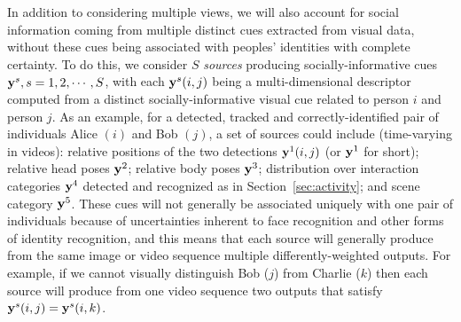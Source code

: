 In addition to considering multiple views, we will also account for social information coming from multiple distinct cues extracted from visual data, without these cues being associated with peoples' identities with complete certainty. To do this, we consider $S$ \emph{sources} producing socially-informative cues ${\bf y}^s, s=1,2,\cdots,S$, with each ${\bf y}^s(i,j)$ being a multi-dimensional descriptor computed from a distinct socially-informative visual cue related to person $i$ and person $j$. As an example, for a detected, tracked and correctly-identified pair of individuals Alice $(i)$ and Bob $(j)$, a set of sources could include (time-varying in videos): relative positions of the two detections ${\bf y}^1(i,j)$ (or ${\bf y}^1$ for short);  relative head poses ${\bf y}^2$; relative body poses ${\bf y}^3$; distribution over interaction categories ${\bf y}^4$ detected and recognized as in Section~\ref{sec:activity}; and scene category ${\bf y}^5$. These cues will not generally be associated uniquely with one pair of individuals because of uncertainties inherent to face recognition and other forms of identity recognition, and this means that
each source will generally produce from the same image or video sequence multiple differently-weighted outputs. For example, if we cannot visually distinguish Bob ($j$) from Charlie ($k$) then each source will produce from one video sequence two outputs that satisfy ${\bf y}^s(i,j)={\bf y}^s(i,k)$. 

